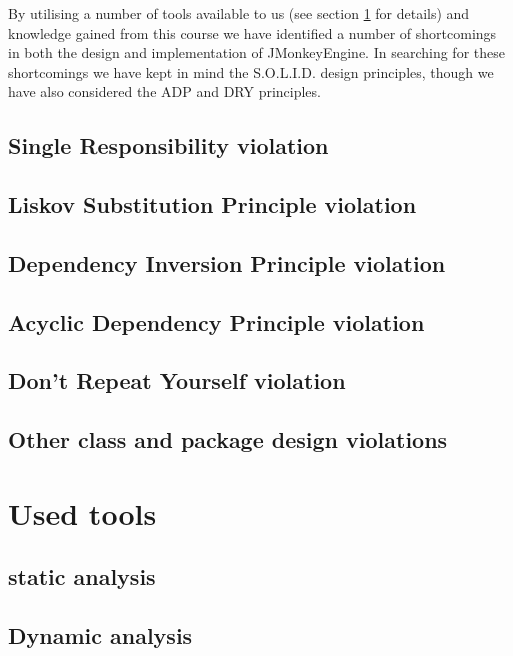 \documentclass[a4paper, 10pt]{article}
\begin{document}
By utilising a number of tools available to us (see section
\ref{sec:used_tools} for details) and knowledge gained from this
course we have identified a number of shortcomings in both the design
and implementation of JMonkeyEngine. In searching for these
shortcomings we have kept in mind the  S.O.L.I.D. design principles,
though we have also considered the ADP and DRY principles.

\subsection{Single Responsibility violation}
\label{sec:srp_violation}


\subsection{Liskov Substitution Principle violation}
\label{sec:lsp_violation} %



\subsection{Dependency Inversion Principle violation}
\label{sec:dip_violation}


\subsection{Acyclic Dependency Principle violation}
\label{sec:adp_violation}


\subsection{Don't Repeat Yourself violation}
\label{sec:dry_violation}


\subsection{Other class and package design violations}
\label{sec:other_violations}

\newpage
\section{Used tools}
\label{sec:used_tools}


\subsection{static analysis}
\label{sec:static_analysis}


\subsection{Dynamic analysis}
\label{sec:dynamic_analysis}
\end{document}
